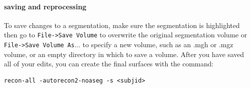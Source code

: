 \documentclass[paper=a4, fontsize=11pt]{scrartcl} %
\numberwithin{equation}{section} %
\numberwithin{figure}{section} %
\numberwithin{table}{section} %
\begin{document}
\paragraph{saving and reprocessing} To save changes to a segmentation, make sure the segmentation is highlighted then go to \texttt{File->Save Volume} to overwrite the original segmentation volume or \texttt{File->Save Volume As}... to specify a new volume, such as an .mgh or .mgz volume, or an empty directory in which to save a volume. After you have saved all of your edits, you can create the final surfaces with the command:
~\\
\begin{lstlisting}[frame=single]
recon-all -autorecon2-noaseg -s <subjid>
\end{lstlisting}
\end{document}
